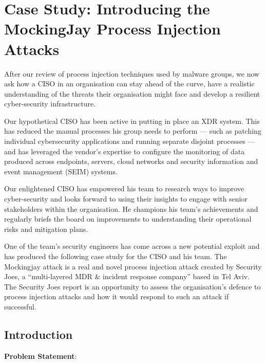 \pagebreak
\section{Case Study: Introducing the MockingJay Process Injection Attacks}

After our review of process injection techniques used by malware groups, we now ask how a CISO in an organisation can stay ahead of the curve,
have a realistic understanding of the threats their organisation might face and develop a resilient cyber-security infrastructure.

Our hypothetical CISO has been active in putting in place an XDR system. This has reduced the manual processes his group needs to
perform --- such as patching individual cybersecurity applications and running separate disjoint processes --- and has leveraged the
vendor's expertise to configure the monitoring of data produced across endpoints, servers, cloud networks and
security information and event management (SEIM) systems.

Our enlightened CISO has empowered his team to research ways to improve cyber-security and looks forward to using their
insights to engage with senior stakeholders within the organisation.  He champions his team's achievements and regularly
briefs the board on improvements to understanding their operational risks and mitigation plans.

One of the team's security engineers has come across a new potential exploit and has produced the following case study for the CISO
and his team.  The Mockingjay attack \autocite{Peixoto:2023} is a real and novel process injection attack created by Security Joes, a
``multi-layered MDR \& incident response company'' based in Tel Aviv.  The Security Joes report is an opportunity to assess the organisation's
defence to process injection attacks and how it would respond to such an attack if successful.

\subsection{Introduction}

\textbf{Problem Statement}:

